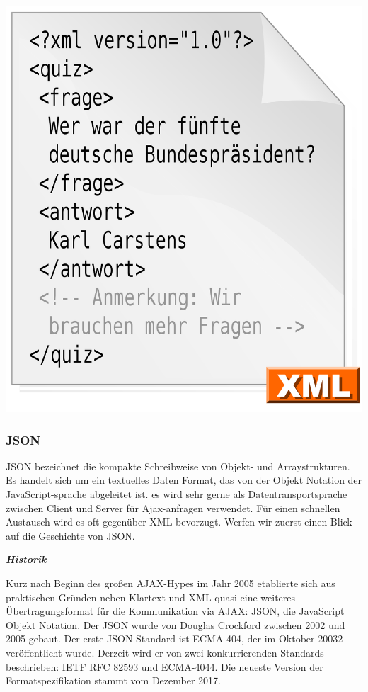 \begin{center}
\includegraphics[scale=.3]{images/Xml_datei_Beispiel}
 \cite{wikimedia_img_xml}
\end{center}

\subsubsection{JSON}

\ac{JSON} bezeichnet die kompakte Schreibweise von Objekt- und Arraystrukturen.\cite{philipp524} Es handelt sich um ein textuelles Daten Format, das von der Objekt Notation der JavaScript-sprache abgeleitet ist. es wird sehr gerne als Datentransportsprache zwischen Client und Server für Ajax-anfragen verwendet. Für einen schnellen Austausch wird es oft gegenüber XML bevorzugt. Werfen wir zuerst einen Blick auf die Geschichte von JSON. 

\textit{\textbf{Historik}}

Kurz nach Beginn des großen AJAX-Hypes im Jahr 2005 etablierte sich aus praktischen Gründen neben Klartext und XML quasi eine weiteres Übertragungsformat für die Kommunikation via \ac{AJAX}: JSON, die JavaScript Objekt Notation.\cite{philipp658}
Der JSON wurde von Douglas Crockford zwischen 2002 und 2005 gebaut. Der erste JSON-Standard ist \ac{ECMA}-404, der im Oktober 20032 veröffentlicht wurde. Derzeit wird er von zwei konkurrierenden Standards beschrieben: IETF RFC 82593 und ECMA-4044. Die neueste Version der Formatspezifikation stammt vom Dezember 2017. \cite{wikip01}

